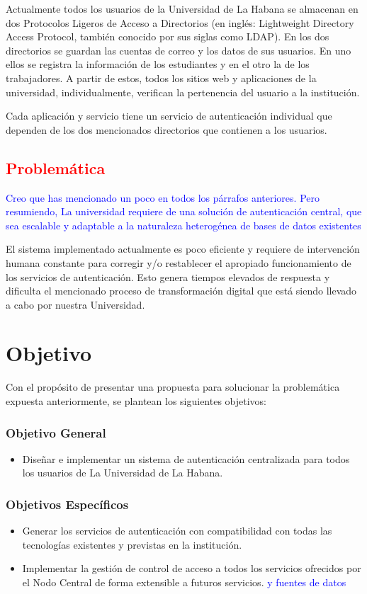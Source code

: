 Actualmente todos los usuarios de la Universidad de La Habana se almacenan en dos Protocolos Ligeros de Acceso a Directorios (en inglés: Lightweight Directory Access Protocol, también conocido por sus siglas como LDAP). En los dos directorios se guardan las cuentas de correo y los datos de sus usuarios. En uno ellos se registra la información de los estudiantes y en el otro la de los trabajadores. A partir de estos, todos los sitios web y aplicaciones de la universidad, individualmente, verifican la pertenencia del usuario a la institución.

Cada aplicación y servicio tiene un servicio de autenticación individual que dependen de los dos mencionados directorios que contienen a los usuarios.

\textcolor{red}{ \section*{Problemática}}
\textcolor{blue}{Creo que has mencionado un poco en todos los párrafos anteriores. Pero resumiendo, La universidad requiere de una solución de autenticación central, que sea escalable y adaptable a la naturaleza heterogénea de bases de datos existentes}

El sistema implementado actualmente es poco eficiente y requiere de intervención humana constante para corregir y/o restablecer el apropiado funcionamiento de los servicios de autenticación. Esto genera tiempos elevados de respuesta y dificulta el mencionado proceso de transformación digital que está siendo llevado a cabo por nuestra Universidad.

\section*{Objetivo}
Con el propósito de presentar una propuesta para solucionar la problemática expuesta anteriormente, se plantean los siguientes objetivos:

\subsubsection*{Objetivo General}

\begin{itemize}	
	\item Diseñar e implementar un sistema de autenticación centralizada para todos los usuarios de La Universidad de La Habana. 
\end{itemize}

\subsubsection*{Objetivos Específicos}
\begin{itemize}	
	\item Generar los servicios de autenticación con compatibilidad con todas las tecnologías existentes y previstas en la institución.
	\item Implementar la gestión de control de acceso a todos los servicios ofrecidos por el Nodo Central de forma extensible a futuros servicios. \textcolor{blue}{y fuentes de datos}
\end{itemize}

